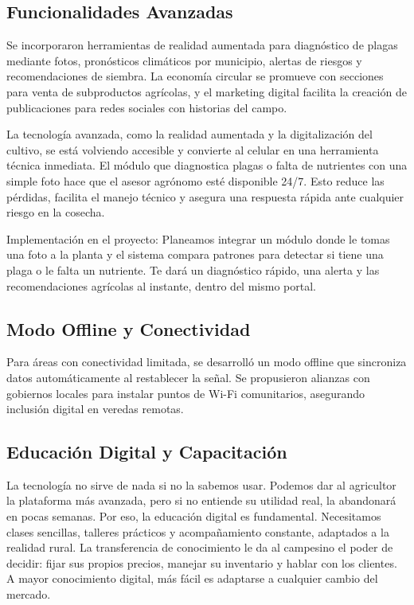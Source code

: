 \subsection{Funcionalidades Avanzadas}
Se incorporaron herramientas de realidad aumentada para diagnóstico de plagas mediante fotos, pronósticos climáticos por municipio, alertas de riesgos y recomendaciones de siembra. La economía circular se promueve con secciones para venta de subproductos agrícolas, y el marketing digital facilita la creación de publicaciones para redes sociales con historias del campo.

La tecnología avanzada, como la realidad aumentada y la digitalización del cultivo, se está volviendo accesible y convierte al celular en una herramienta técnica inmediata. El módulo que diagnostica plagas o falta de nutrientes con una simple foto hace que el asesor agrónomo esté disponible 24/7. Esto reduce las pérdidas, facilita el manejo técnico y asegura una respuesta rápida ante cualquier riesgo en la cosecha.

Implementación en el proyecto: Planeamos integrar un módulo donde le tomas una foto a la planta y el sistema compara patrones para detectar si tiene una plaga o le falta un nutriente. Te dará un diagnóstico rápido, una alerta y las recomendaciones agrícolas al instante, dentro del mismo portal.

\subsection{Modo Offline y Conectividad}
Para áreas con conectividad limitada, se desarrolló un modo offline que sincroniza datos automáticamente al restablecer la señal. Se propusieron alianzas con gobiernos locales para instalar puntos de Wi-Fi comunitarios, asegurando inclusión digital en veredas remotas.

\subsection{Educación Digital y Capacitación}
La tecnología no sirve de nada si no la sabemos usar. Podemos dar al agricultor la plataforma más avanzada, pero si no entiende su utilidad real, la abandonará en pocas semanas. Por eso, la educación digital es fundamental. Necesitamos clases sencillas, talleres prácticos y acompañamiento constante, adaptados a la realidad rural. La transferencia de conocimiento le da al campesino el poder de decidir: fijar sus propios precios, manejar su inventario y hablar con los clientes. A mayor conocimiento digital, más fácil es adaptarse a cualquier cambio del mercado.

